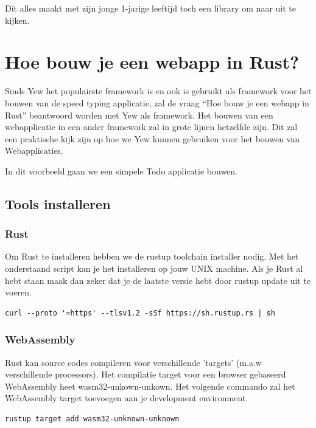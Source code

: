 Dit alles maakt met zijn jonge 1-jarige leeftijd toch een library om naar uit te kijken. 

\clearpage

\section{Hoe bouw je een webapp in Rust?}

Sinds Yew het populairste framework is en ook is gebruikt als framework voor het bouwen van de speed
typing applicatie, zal de vraag \enquote{Hoe bouw je een webapp in Rust} beantwoord worden met Yew
als framework. Het bouwen van een webapplicatie in een ander framework zal in grote lijnen hetzelfde
zijn. Dit zal een praktische kijk zijn op hoe we Yew kunnen gebruiken voor het bouwen van
Webapplicaties. \cite{yew_introduction}

In dit voorbeeld gaan we een simpele Todo applicatie bouwen.

\subsection{Tools installeren}

\subsubsection{Rust}
Om Rust te installeren hebben we de rustup toolchain installer nodig. Met het onderstaand script kan
je het installeren op jouw UNIX machine. Als je Rust al hebt staan maak dan zeker dat je de laatste
versie hebt door rustup update uit te voeren.

\begin{verbatim}
curl --proto '=https' --tlsv1.2 -sSf https://sh.rustup.rs | sh
\end{verbatim}

\subsubsection{WebAssembly}

Rust kan source codes compileren voor verschillende 'targets' (m.a.w verschillende processors). Het
compilatie target voor een browser gebaseerd WebAssembly heet wasm32-unkown-unkown. Het volgende
commando zal het WebAssembly target toevoegen aan je development environment.

\begin{verbatim}
rustup target add wasm32-unknown-unknown
\end{verbatim}

